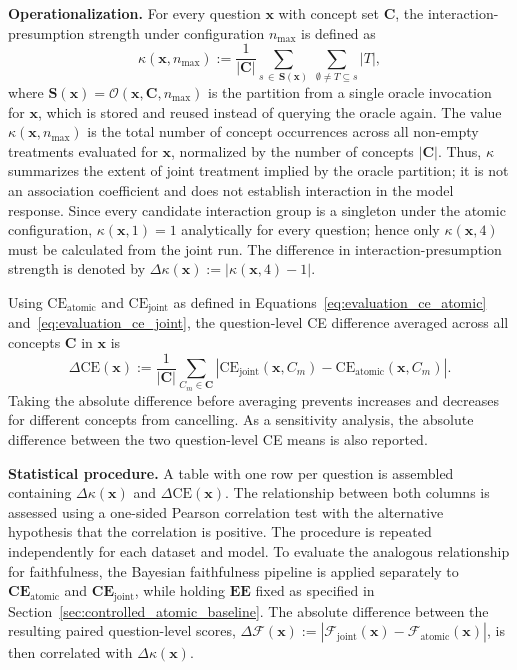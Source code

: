 \noindent\textbf{Operationalization.} For every question $\mathbf{x}$ with concept set $\mathbf{C}$, the interaction-presumption strength under configuration $n_{\max}$ is defined as
\begin{equation}
	\kappa(\mathbf{x}, n_{\max}) := \frac{1}{|\mathbf{C}|} \sum_{s \,\in\, \mathbf{S}(\mathbf{x})} \ \sum_{\emptyset \neq T \subseteq s} |T|,
\end{equation}
where $\mathbf{S}(\mathbf{x})=\mathcal{O}(\mathbf{x},\mathbf{C},n_{\max})$ is the partition from a single oracle invocation for $\mathbf{x}$, which is stored and reused instead of querying the oracle again. The value $\kappa(\mathbf{x},n_{\max})$ is the total number of concept occurrences across all non-empty treatments evaluated for $\mathbf{x}$, normalized by the number of concepts $|\mathbf{C}|$. Thus, $\kappa$ summarizes the extent of joint treatment implied by the oracle partition; it is not an association coefficient and does not establish interaction in the model response. Since every candidate interaction group is a singleton under the atomic configuration, $\kappa(\mathbf{x},1)=1$ analytically for every question; hence only $\kappa(\mathbf{x},4)$ must be calculated from the joint run. The difference in interaction-presumption strength is denoted by $\Delta\kappa(\mathbf{x}) := |\kappa(\mathbf{x},4)-1|$.

Using $\mathrm{CE}_{\mathrm{atomic}}$ and $\mathrm{CE}_{\mathrm{joint}}$ as defined in Equations~\ref{eq:evaluation_ce_atomic} and~\ref{eq:evaluation_ce_joint}, the question-level CE difference averaged across all concepts $\mathbf{C}$ in $\mathbf{x}$ is
\begin{equation}
	\Delta \mathrm{CE}(\mathbf{x}) := \frac{1}{|\mathbf{C}|}\sum_{C_m\in\mathbf{C}}
	\left|\mathrm{CE}_{\mathrm{joint}}(\mathbf{x},C_m)-\mathrm{CE}_{\mathrm{atomic}}(\mathbf{x},C_m)\right|.
\end{equation}
Taking the absolute difference before averaging prevents increases and decreases for different concepts from cancelling. As a sensitivity analysis, the absolute difference between the two question-level CE means is also reported.

\noindent\textbf{Statistical procedure.} A table with one row per question is assembled containing $\Delta\kappa(\mathbf{x})$ and $\Delta \mathrm{CE}(\mathbf{x})$. The relationship between both columns is assessed using a one-sided Pearson correlation test with the alternative hypothesis that the correlation is positive. The procedure is repeated independently for each dataset and model. To evaluate the analogous relationship for faithfulness, the Bayesian faithfulness pipeline is applied separately to $\mathbf{CE}_{\mathrm{atomic}}$ and $\mathbf{CE}_{\mathrm{joint}}$, while holding $\mathbf{EE}$ fixed as specified in Section~\ref{sec:controlled_atomic_baseline}. The absolute difference between the resulting paired question-level scores, $\Delta\mathcal{F}(\mathbf{x}):=|\mathcal{F}_{\mathrm{joint}}(\mathbf{x})-\mathcal{F}_{\mathrm{atomic}}(\mathbf{x})|$, is then correlated with $\Delta\kappa(\mathbf{x})$.

